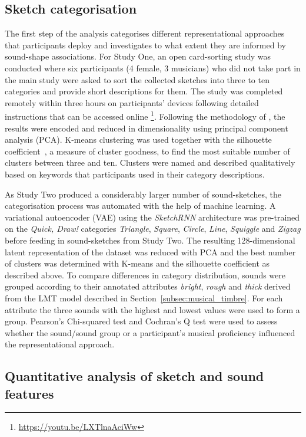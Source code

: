 \documentclass[]{interact}
\theoremstyle{plain}%
\theoremstyle{definition}
\theoremstyle{remark}
\begin{document}
\subsection{Sketch categorisation}\label{subsec:qualitative_analysis}
The first step of the analysis categorises different representational approaches that participants deploy and investigates to what extent they are informed by sound-shape associations. For Study One, an open card-sorting study was conducted where six participants (4 female, 3 musicians) who did not take part in the main study were asked to sort the collected sketches into three to ten categories and provide short descriptions for them. The study was completed remotely within three hours on participants' devices following detailed instructions that can be accessed online \footnote{\url{https://youtu.be/LXTlnaAciWw}}. Following the methodology of , the results were encoded and reduced in dimensionality using principal component analysis (PCA). K-means clustering was used together with the silhouette coefficient~\cite{rousseeuw1987silhouettes}, a measure of cluster goodness, to find the most suitable number of clusters between three and ten. Clusters were named and described qualitatively based on keywords that participants used in their category descriptions. 

As Study Two produced a considerably larger number of sound-sketches, the categorisation process was automated with the help of machine learning. A variational autoencoder (VAE) using the \textit{SketchRNN} architecture was pre-trained on the \textit{Quick, Draw!} categories \textit{Triangle}, \textit{Square}, \textit{Circle}, \textit{Line}, \textit{Squiggle} and \textit{Zigzag} before feeding in sound-sketches from Study Two. The resulting 128-dimensional latent representation of the dataset was reduced with PCA and the best number of clusters was determined with K-means and the silhouette coefficient as described above. To compare differences in category distribution, sounds were grouped according to their annotated attributes \textit{bright}, \textit{rough} and \textit{thick} derived from the LMT model described in Section~\ref{subsec:musical_timbre}. For each attribute the three sounds with the highest and lowest values were used to form a group. Pearson's Chi-squared test and Cochran's Q test were used to assess whether the sound/sound group or a participant's musical proficiency influenced the representational approach.

\subsection{Quantitative analysis of sketch and sound features}\label{subsec:feature_analysis}
\end{document}
